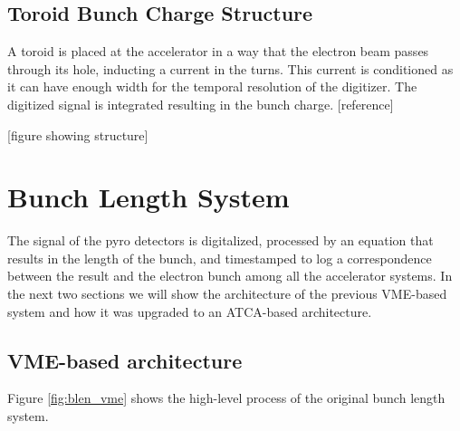 \documentclass[letter,
               biblatex,     %
               keeplastbox,   %
               ]{jacow}
\begin{document}
\subsection{Toroid Bunch Charge Structure}
A toroid is placed at the accelerator in a way that the electron beam passes through its hole, inducting a current in the turns. This current is conditioned as it can have enough width for the temporal resolution of the digitizer. The digitized signal is integrated resulting in the bunch charge. [reference]

[figure showing structure]

\section{Bunch Length System}
The signal of the pyro detectors is digitalized, processed by an equation that results in the length of the bunch, and timestamped to log a correspondence between the result and the electron bunch among all the accelerator systems. In the next two sections we will show the architecture of the previous VME-based system and how it was upgraded to an ATCA-based architecture.

\subsection{VME-based architecture}
Figure \ref{fig:blen_vme} shows the high-level process of the original bunch length system.
\end{document}
